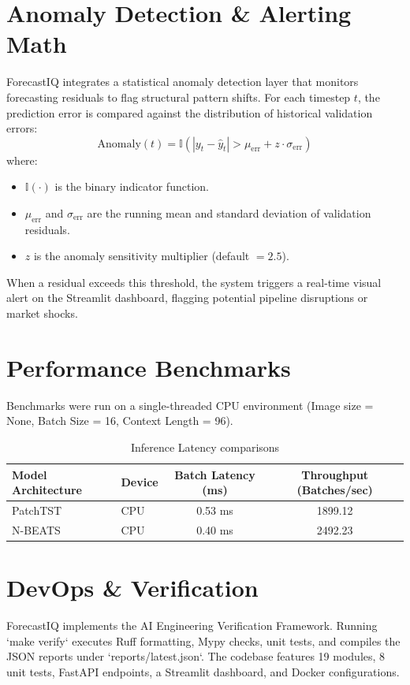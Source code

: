 \documentclass[11pt,journal,onecolumn]{IEEEtran}
\begin{document}
\section{Anomaly Detection \& Alerting Math}
ForecastIQ integrates a statistical anomaly detection layer that monitors forecasting residuals to flag structural pattern shifts. For each timestep $t$, the prediction error is compared against the distribution of historical validation errors:
\begin{equation}
\text{Anomaly}(t) = \mathbb{I}\left(|y_t - \hat{y}_t| > \mu_{\text{err}} + z \cdot \sigma_{\text{err}}\right)
\end{equation}
where:
\begin{itemize}
    \item $\mathbb{I}(\cdot)$ is the binary indicator function.
    \item $\mu_{\text{err}}$ and $\sigma_{\text{err}}$ are the running mean and standard deviation of validation residuals.
    \item $z$ is the anomaly sensitivity multiplier (default $= 2.5$).
\end{itemize}
When a residual exceeds this threshold, the system triggers a real-time visual alert on the Streamlit dashboard, flagging potential pipeline disruptions or market shocks.

\section{Performance Benchmarks}
Benchmarks were run on a single-threaded CPU environment (Image size = None, Batch Size = 16, Context Length = 96).

\begin{table}[h]
\centering
\caption{Inference Latency comparisons}
\begin{tabular}{llcc}
\toprule
\textbf{Model Architecture} & \textbf{Device} & \textbf{Batch Latency (ms)} & \textbf{Throughput (Batches/sec)} \\
\midrule
PatchTST & CPU & 0.53 ms & 1899.12 \\
N-BEATS & CPU & 0.40 ms & 2492.23 \\
\bottomrule
\end{tabular}
\end{table}

\section{DevOps \& Verification}
ForecastIQ implements the AI Engineering Verification Framework. Running `make verify` executes Ruff formatting, Mypy checks, unit tests, and compiles the JSON reports under `reports/latest.json`. The codebase features 19 modules, 8 unit tests, FastAPI endpoints, a Streamlit dashboard, and Docker configurations.
\end{document}
